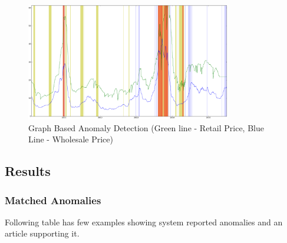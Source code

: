 \documentclass[a4paper,10pt]{article}
\begin{document}
\begin{figure}[H]
\centering
\includegraphics[width=0.8\textwidth]{graphs/12331.png}
\caption{Graph Based Anomaly Detection (Green line - Retail Price, Blue Line - Wholesale Price)}
\label{fig:12331}
\end{figure}

\subsection{Results}
\subsubsection{Matched Anomalies}

Following table has few examples showing system reported anomalies and an article supporting it.
\end{document}
